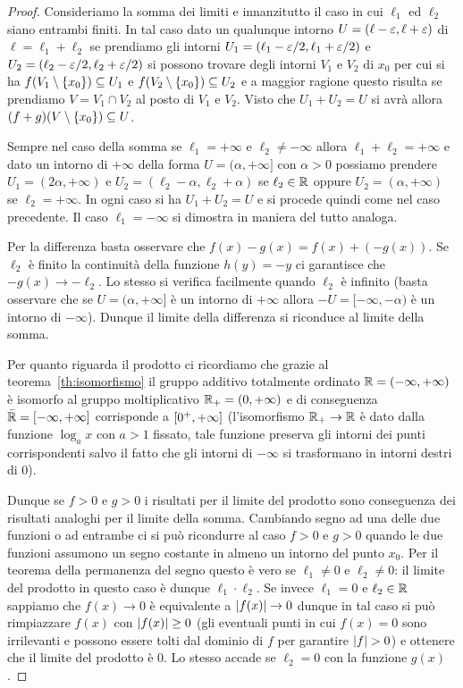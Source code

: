 \begin{proof}
Consideriamo la somma dei limiti
e innanzitutto il caso in cui $\ell_1$ ed $\ell_2$ 
siano entrambi finiti. 
In tal caso
dato un qualunque intorno $U=(\ell-\varepsilon,\ell+\varepsilon)$ 
di $\ell=\ell_1+\ell_2$
se prendiamo gli intorni $U_1=(\ell_1-\varepsilon/2,\ell_1+\varepsilon/2)$ 
e $U_2 = (\ell_2-\varepsilon/2,\ell_2+\varepsilon/2)$ si possono trovare 
degli intorni $V_1$ e $V_2$ di $x_0$ per cui si ha 
$f(V_1\setminus{\left\{ x_0 \right\}}) \subseteq U_1$ e 
$f(V_2\setminus {\left\{ x_0 \right\}}) \subseteq U_2$
e a maggior ragione questo risulta se prendiamo $V=V_1\cap V_2$ 
al posto di $V_1$ e $V_2$. 
Visto che $U_1+U_2 = U$ si avrà allora 
$(f+g)(V\setminus{\left\{ x_0 \right\}})\subseteq U$.

Sempre nel caso della somma 
se $\ell_1=+\infty$ e $\ell_2\neq -\infty$
allora $\ell_1+\ell_2=+\infty$ e 
dato un intorno di $+\infty$ 
della forma $U=(\alpha,+\infty]$ con $\alpha>0$
possiamo prendere 
$U_1 = (2\alpha,+\infty)$ e $U_2 = (\ell_2-\alpha,\ell_2+\alpha)$ 
se $\ell_2\in {\mathbb R}$ oppure $U_2 = (\alpha,+\infty)$ se $\ell_2=+\infty$.
In ogni caso si ha $U_1+U_2 = U$ e si procede quindi come nel caso precedente.
Il caso $\ell_1=-\infty$ si dimostra in maniera del tutto analoga.

Per la differenza basta osservare che $f(x)-g(x) = f(x) + (-g(x))$.
Se $\ell_2$ è finito la continuità della funzione $h(y)=-y$
ci garantisce che $-g(x)\to -\ell_2$.
Lo stesso si verifica facilmente quando $\ell_2$ è infinito 
(basta osservare che se $U=(\alpha,+\infty]$ è un intorno di $+\infty$
allora $-U = [-\infty,-\alpha)$ è un intorno di $-\infty$). 
Dunque il limite della differenza si riconduce al limite della somma.

Per quanto riguarda il prodotto ci ricordiamo che grazie 
al teorema~\ref{th:isomorfismo} il gruppo additivo totalmente 
ordinato ${\mathbb R} = \left(-\infty,+\infty\right)$ 
è isomorfo al gruppo moltiplicativo ${\mathbb R}_+ = \left(0,+\infty\right)$
e di conseguenza $\bar {{\mathbb R}} = \left[-\infty,+\infty\right]$
corrisponde a $\left[0^+,+\infty\right]$
(l'isomorfismo ${\mathbb R}_+\to {\mathbb R}$ è dato dalla funzione $\log_a x$ con $a>1$ 
fissato,
tale funzione preserva gli intorni dei punti corrispondenti salvo il fatto 
che gli intorni di $-\infty$ si trasformano in intorni destri di $0$).

Dunque se $f > 0$ e $g > 0$ i risultati per il limite del prodotto 
sono conseguenza dei risultati analoghi per il limite della somma.
Cambiando segno ad una delle due funzioni o ad entrambe ci si può 
ricondurre al caso $f > 0$ e $g > 0$ quando le due funzioni assumono 
un segno costante in almeno un intorno del punto $x_0$.
Per il teorema della permanenza del segno questo è vero se 
$\ell_1\neq 0$ e $\ell_2\neq 0$: il limite del prodotto in questo caso 
è dunque $\ell_1\cdot \ell_2$.
Se invece $\ell_1=0$ e $\ell_2\in{\mathbb R}$ sappiamo che $f(x)\to 0$ 
è equivalente a ${\left|f(x)\right|}\to 0$ dunque in tal caso si può rimpiazzare $f(x)$ con ${\left|f(x)\right|}\ge 0$
(gli eventuali punti in cui $f(x)=0$ sono irrilevanti e possono essere tolti 
dal dominio di $f$ per garantire ${\left|f\right|}>0$) e ottenere che il limite 
del prodotto è $0$.
Lo stesso accade se $\ell_2=0$ con la funzione $g(x)$.


\end{proof}
